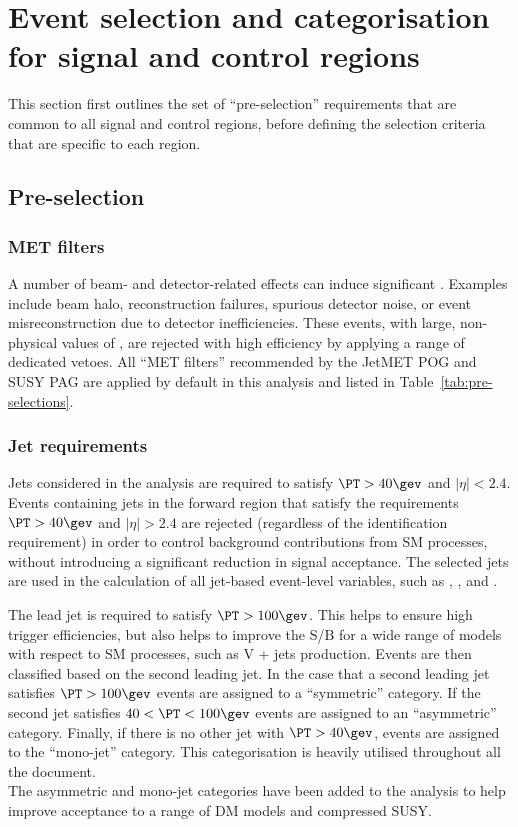 \section{Event selection and categorisation for signal and control regions}
\label{sec:selection}

This section first outlines the set of ``pre-selection'' requirements
that are common to all signal and control regions, before defining the
selection criteria that are specific to each region.

\subsection{Pre-selection}
\label{sec:preSelection}

\subsubsection{MET filters}

A number of beam- and detector-related effects can induce significant
\met. Examples include beam halo, reconstruction failures, spurious
detector noise, or event misreconstruction due to detector
inefficiencies. These events, with large, non-physical values of \met,
are rejected with high efficiency by applying a range of dedicated
vetoes. All ``MET filters'' recommended by the JetMET POG and SUSY PAG
are applied by default in this analysis and listed in Table~\ref{tab:pre-selections}.

\subsubsection{Jet requirements}

Jets considered in the analysis are required to satisfy $\PT>40\gev$
and $|\eta|<2.4$. Events containing jets in the forward region that
satisfy the requirements $\PT>40\gev$ and $|\eta|>2.4$ are rejected (regardless of the identification requirement) 
in order to control background contributions from SM processes, without
introducing a significant reduction in signal acceptance. The selected jets 
are used in the calculation of all jet-based
event-level variables, such as \HT, \mht, and \alphat.

The lead jet is required to satisfy $\PT > 100\gev$. 
This helps to ensure high trigger efficiencies,
but also helps to improve the S/B for a wide
range of models with respect to SM processes, such as V + jets
production. Events are then classified based on the
second leading jet. In the case that a second leading jet satisfies $\PT > 100\gev$ 
events are assigned to a ``symmetric'' \njet category. If the second
jet satisfies $40 < \PT < 100\gev$ events are assigned to an
``asymmetric'' \njet category. Finally, if there is no other jet 
with $\PT>40\gev$, events are assigned to the ``mono-jet''
category. This categorisation is heavily utilised throughout all the document. \\
The asymmetric and mono-jet categories have been added to
the analysis to help improve acceptance to a range of DM models and compressed
SUSY.

